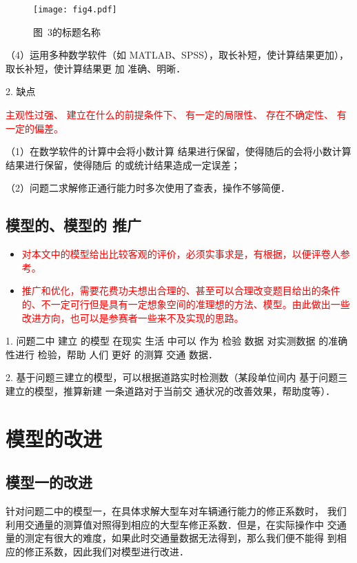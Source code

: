 \documentclass[12pt,a4paper]{nmmcm}
\begin{document}
\begin{figure}[h!t]
  \centerline{\texttt{[image: fig4.pdf]}}
  \caption{\song\wuhao 图~3的标题名称}
\end{figure}


（4）运用多种数学软件（如 MATLAB、SPSS），取长补短，使计算结果更加），取长补短，使计算结果更
加 准确、明晰．

2. 缺点

\textcolor{red}{主观性过强、
  建立在什么的前提条件下、
  有一定的局限性、
  存在不确定性、
  有一定的偏差。
}

（1）在数学软件的计算中会将小数计算 结果进行保留，使得随后的会将小数计算 结果进行保留，使得随后
的或统计结果造成一定误差；

（2）问题二求解修正通行能力时多次使用了查表，操作不够简便．

\subsection{模型的、模型的 推广}

\begin{itemize}

  \item \textcolor{red}{对本文中的模型给出比较客观的评价，必须实事求是，有根据，以便评卷人参考。}

  \item \textcolor{red}{推广和优化，需要花费功夫想出合理的、甚至可以合理改变题目给出的条件的、不一定可行但是具有一定想象空间的准理想的方法、模型。由此做出一些改进方向，也可以是参赛者一些来不及实现的思路。}
\end{itemize}

1. 问题二中 建立 的模型 在现实 生活 中可以 作为 检验 数据 对实测数据 的准确 性进行 检验，帮助 人们
更好 的测算 交通 数据．

2. 基于问题三建立的模型，可以根据道路实时检测数（某段单位间内 基于问题三建立的模型，推算新建
一条道路对于当前交 通状况的改善效果，帮助度等）．

\section{模型的改进}

\subsection{模型一的改进}
针对问题二中的模型一，在具体求解大型车对车辆通行能力的修正系数时，
我们利用交通量的测算值对照得到相应的大型车修正系数．但是，在实际操作中
交通量的测定有很大的难度，如果此时交通量数据无法得到，那么我们便不能得
到相应的修正系数，因此我们对模型进行改进．
\end{document}
